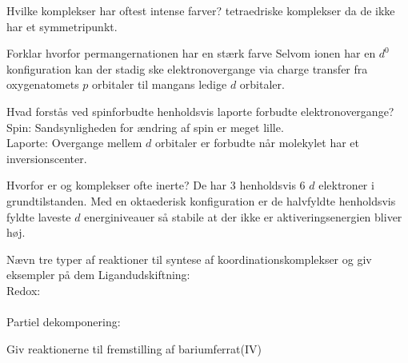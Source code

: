 \begin{flashcard}[Teori]{Hvilke komplekser har oftest intense farver?}
tetraedriske komplekser da de ikke har et symmetripunkt.
\end{flashcard}


\begin{flashcard}[Egenskab]{Forklar hvorfor permangernationen har en stærk farve}
Selvom ionen har en $d^{0}$ konfiguration kan der stadig ske elektronovergange via charge transfer fra oxygenatomets $p$ orbitaler til mangans ledige $d$ orbitaler.
\end{flashcard}


\begin{flashcard}[Teori]{Hvad forstås ved spinforbudte henholdsvis laporte forbudte elektronovergange?}
Spin: Sandsynligheden for ændring af spin er meget lille.\\
Laporte: Overgange mellem $d$ orbitaler er forbudte når molekylet har et inversionscenter.
\end{flashcard}


\begin{flashcard}[Egenskab]{Hvorfor er  og  komplekser ofte inerte?}
De har 3 henholdsvis 6 $d$ elektroner i grundtilstanden. Med en oktaederisk konfiguration er de halvfyldte henholdsvis fyldte laveste $d$ energiniveauer så stabile at der ikke er aktiveringsenergien bliver høj.
\end{flashcard}


\begin{flashcard}[Teori]{Nævn tre typer af reaktioner til syntese af koordinationskomplekser og giv eksempler på dem}
Ligandudskiftning: \\\vspace*{0.5cm}
Redox:\\\\\vspace*{0.5cm}
Partiel dekomponering: 
\end{flashcard}


\begin{flashcard}[Fremstilling]{Giv reaktionerne til fremstilling af bariumferrat(IV)}
\\\vspace*{0.5cm}
\end{flashcard}

